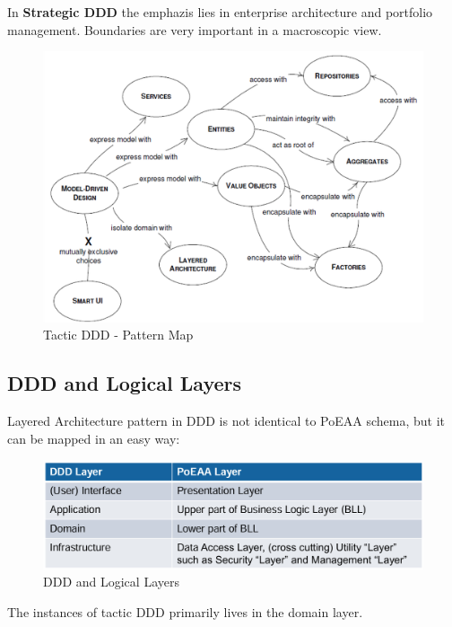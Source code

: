 \documentclass[../Main.tex]{subfiles}
\begin{document}
In \textbf{Strategic DDD} the emphazis lies in enterprise architecture and
portfolio management. Boundaries are very important in a macroscopic view.

\begin{figure}[H]
    \centering
    \includegraphics[width=0.8\linewidth]{Images/patternmap-tactic-ddd.png}
    \caption{Tactic DDD - Pattern Map}
\end{figure}

\newpage
\subsection{DDD and Logical Layers}
Layered Architecture pattern in DDD is not identical to PoEAA schema, but
it can be mapped in an easy way:
\begin{figure}[H]
    \centering
    \includegraphics[width=1\linewidth]{Images/ddd-logical-layers.png}
    \caption{DDD and Logical Layers}
\end{figure}
The instances of tactic DDD primarily lives in the domain layer.
\end{document}
